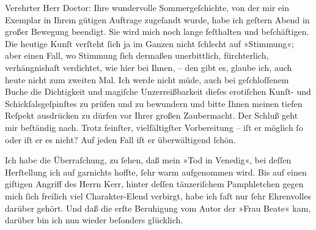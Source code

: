 \pstart{}Verehrter Herr Doctor:\pend\vspace{0.5em}
\pstart
           Ihre wundervolle Sommergeſchichte, von der mir ein Exemplar in Ihrem gütigen Auftrage
               zugeſandt wurde, habe ich geſtern Abend in großer Bewegung beendigt. Sie wird mich
               noch lange feſthalten und beſchäftigen. Die heutige Kunſt verſteht{ }ſich ja im Ganzen
               nicht{ }ſchlecht auf »Stimmung«; aber einen Fall, wo Stimmung{ }ſich dermaßen
               unerbittlich, fürchterlich, verhängnishaft verdichtet, wie hier bei Ihnen, – den gibt
               es, glaube ich, auch heute {\pb}nicht zum
               zweiten Mal. Ich werde nicht müde, auch bei geſchloſſenem Buche die Dichtigkeit und
               magiſche Unzerreißbarkeit dieſes erotiſchen Kunſt- und Schickſalsgeſpinſtes zu prüfen
               und zu bewundern und bitte Ihnen meinen tiefen Reſpekt ausdrücken zu dürfen vor Ihrer
               großen Zaubermacht. Der Schluß geht mir beſtändig nach. Trotz feinſter,
               vielfältigſter Vorbereitung – iſt er möglich{ }ſo oder iſt er es nicht? Auf jeden Fall
               iſt er überwältigend{ }ſchön.\pend
           
\pstart
           Ich habe die Überraſchung, zu{ }ſehen, daß mein »Tod in
                  Venedig«, bei deſſen Herſtellung ich {\pb}auf garnichts hoffte,{ }ſehr warm
               aufgenommen wird. Bis auf einen giftigen Angriff des Herrn Kerr, hinter deſſen tänzeriſchem Pamphletchen gegen mich{ }ſich freilich viel Charakter-Elend
               verbirgt, habe ich faſt nur{ }ſehr Ehrenvolles darüber gehört. Und daß die erſte
               Beruhigung vom Autor der »Frau Beate« kam,
               darüber bin ich nun wieder beſonders glücklich.\pend
           
